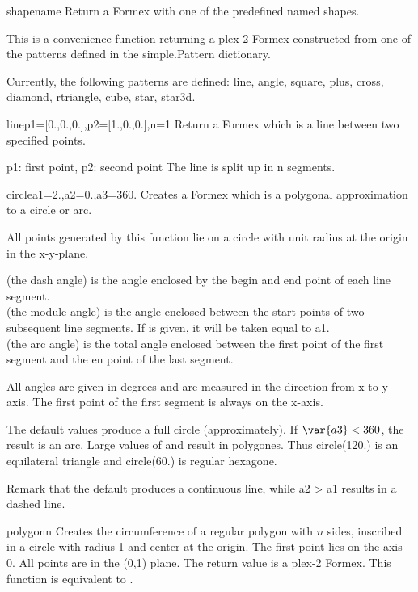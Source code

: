 \begin{funcdesc}{shape}{name}
  Return a Formex with one of the predefined named shapes.

  This is a convenience function returning a plex-2 Formex constructed
  from one of the patterns defined in the simple.Pattern dictionary.

  Currently, the following patterns are defined: line, angle, square, plus,
  cross, diamond, rtriangle, cube, star, star3d.
\end{funcdesc}
  

\begin{funcdesc}{line}{p1=[0.,0.,0.],p2=[1.,0.,0.],n=1}
  Return a Formex which is a line between two specified points.
    
  p1: first point, p2: second point
  The line is split up in n segments.
\end{funcdesc}


\begin{funcdesc}{circle}{a1=2.,a2=0.,a3=360.}
Creates a Formex which is a polygonal approximation to a circle or arc.

All points generated by this function lie on a circle with unit radius at the origin in the x-y-plane.

 (the dash angle) is the angle enclosed by the begin and end point of each line segment.\\
 (the module angle) is the angle enclosed between the start points of two subsequent line segments. 
If  is given, it will be taken equal to a1.\\
 (the arc angle) is the total angle enclosed between the first point of the first segment and the en point of the last segment.

All angles are given in degrees and are measured in the direction from x to y-axis. The first point of the first segment is always on the x-axis.

The default values produce a full circle (approximately). If $\var{a3} < 360$, the result is an arc.
Large values of  and  result in polygones. Thus circle(120.) is an
equilateral triangle and circle(60.) is regular hexagone.

Remark that the default  produces a continuous line, while a2 > a1 results in a dashed line.

\end{funcdesc}


\begin{funcdesc}{polygon}{n}
Creates the circumference of a regular polygon with $n$ sides, inscribed in a circle with radius 1 and center at the origin. The first point lies on the axis 0. All points are in the (0,1) plane. 
The return value is a plex-2 Formex. 
This function is equivalent to .
\end{funcdesc}


